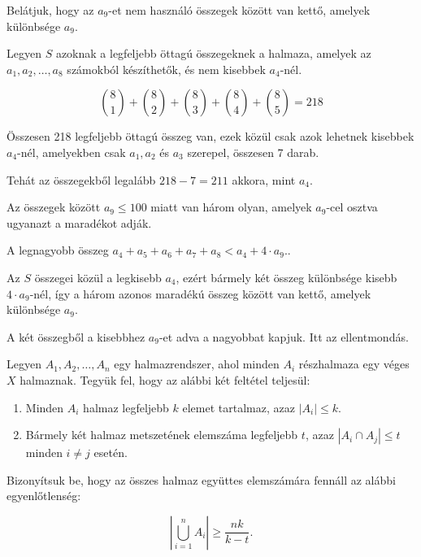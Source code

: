 \begin{solution}
	Belátjuk, hogy az $a_{9}$-et nem használó összegek között van kettő,
	amelyek különbsége $a_{9}$.
	
	Legyen $S$ azoknak a legfeljebb öttagú összegeknek a halmaza, amelyek
	az $a_{1},a_{2},\dots,a_{8}$ számokból készíthetők, és nem kisebbek
	$a_{4}$-nél.
	
	\[
	\binom{8}{1}+\binom{8}{2}+\binom{8}{3}+\binom{8}{4}+\binom{8}{5}=218
	\]
	
	Összesen 218 legfeljebb öttagú összeg van, ezek közül csak azok lehetnek
	kisebbek $a_{4}$-nél, amelyekben csak $a_{1},a_{2}$ és $a_{3}$
	szerepel, összesen 7 darab.
	
	Tehát az összegekből legalább $218-7=211$ akkora, mint $a_{4}$.
	
	Az összegek között $a_{9}\leq100$ miatt van három olyan, amelyek
	$a_{9}$-cel osztva ugyanazt a maradékot adják.
	
	A legnagyobb összeg $a_{4}+a_{5}+a_{6}+a_{7}+a_{8}<a_{4}+4\cdot a_{9}.$.
	
	Az $S$ összegei közül a legkisebb $a_{4}$, ezért bármely két összeg
	különbsége kisebb $4\cdot a_{9}$-nél, így a három azonos maradékú
	összeg között van kettő, amelyek különbsége $a_{9}$.
	
	A két összegből a kisebbhez $a_{9}$-et adva a nagyobbat kapjuk. Itt
	az ellentmondás.
\end{solution}
\begin{extraproblem}
	Legyen $A_{1},A_{2},\dots,A_{n}$ egy halmazrendszer, ahol minden
	$A_{i}$ részhalmaza egy véges $X$ halmaznak. Tegyük fel, hogy az
	alábbi két feltétel teljesül:
	\begin{enumerate}
		\item Minden $A_{i}$ halmaz legfeljebb $k$ elemet tartalmaz, azaz $|A_{i}|\leq k$.
		\item Bármely két halmaz metszetének elemszáma legfeljebb $t$, azaz $|A_{i}\cap A_{j}|\leq t$
		minden $i\neq j$ esetén.
	\end{enumerate}
	Bizonyítsuk be, hogy az összes halmaz együttes elemszámára fennáll
	az alábbi egyenlőtlenség:
	
	\[
	\left|\bigcup_{i=1}^{n}A_{i}\right|\geq\frac{nk}{k-t}.
	\]
\end{extraproblem}
